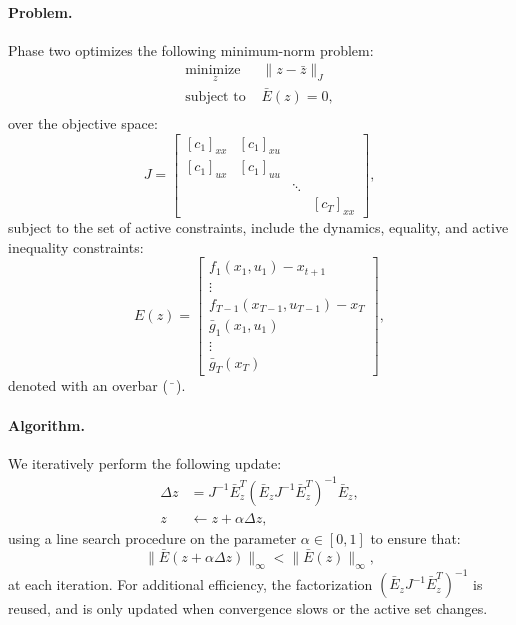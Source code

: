 \paragraph{Problem.} Phase two optimizes the following minimum-norm \cite{nocedal2006numerical} problem:
\begin{equation}
	\begin{array}{ll}
		\underset{z}{\mbox{minimize }}  & \| z - \bar{z} \|_J \\
		\mbox{subject to } & \bar{E}(z) = 0, \\
	\end{array} \label{altro_solution_polishing}
\end{equation}
over the objective space:
\begin{equation}
	J = \begin{bmatrix} 
			[c_1]_{xx} & [c_1]_{xu} & & \\ 
			[c_1]_{ux} & [c_1]_{uu} & & \\ 
			& & \ddots & \\ & & & [c_T]_{xx} 
		\end{bmatrix},
\end{equation}
subject to the set of active constraints, include the dynamics, equality, and active inequality constraints:
\begin{equation}
	E(z) = \begin{bmatrix} 
			f_1(x_1, u_1) - x_{t+1} \\ 
			\vdots \\
			f_{T-1}(x_{T-1}, u_{T-1}) - x_{T} \\
			\bar{g}_1(x_1, u_1) \\
			\vdots \\
			\bar{g}_T(x_T)
		\end{bmatrix},
\end{equation} 
denoted with an overbar ($\bar{\phantom{x}}$). 

\paragraph{Algorithm.} 
We iteratively perform the following update: 
\begin{align}
	\Delta z &= J^{-1} \bar{E}_z^T (\bar{E}_{z} J^{-1} \bar{E}_{z}^T)^{-1} \bar{E}_{z}, \\
	z &\leftarrow z + \alpha \Delta z,
\end{align}
using a line search procedure on the parameter $\alpha \in [0, 1]$ to ensure that:
\begin{equation}
	\|\bar{E}(z + \alpha \Delta z)\|_{\infty} < \|\bar{E}(z)\|_{\infty},
\end{equation} 
at each iteration. For additional efficiency, the factorization $(\bar{E}_{z} J^{-1} \bar{E}_{z}^T)^{-1}$ is reused, and is only updated when convergence slows or the active set changes.

